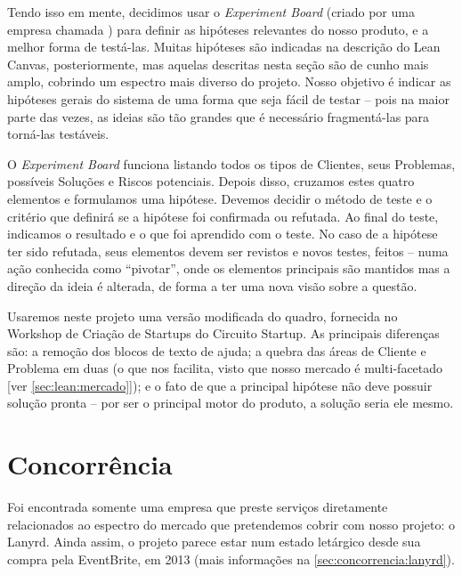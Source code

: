 \documentclass[12pt,a4paper,twoside,hyphens,english,brazil]{abntex2}
\begin{document}
Tendo isso em mente, decidimos usar o \emph{Experiment Board} (criado por uma empresa chamada ) para definir as hipóteses relevantes do nosso produto, e a melhor forma de testá-las. Muitas hipóteses são indicadas na descrição do Lean Canvas, posteriormente, mas aquelas descritas nesta seção são de cunho mais amplo, cobrindo um espectro mais diverso do projeto. Nosso objetivo é indicar as hipóteses gerais do sistema de uma forma que seja fácil de testar -- pois na maior parte das vezes, as ideias são tão grandes que é necessário fragmentá-las para torná-las testáveis\cite{experiment-board-post}.

O \emph{Experiment Board} funciona listando todos os tipos de Clientes, seus Problemas, possíveis Soluções e Riscos potenciais. Depois disso, cruzamos estes quatro elementos e formulamos uma hipótese. Devemos decidir o método de teste e o critério que definirá se a hipótese foi confirmada ou refutada. Ao final do teste, indicamos o resultado e o que foi aprendido com o teste. No caso de a hipótese ter sido refutada, seus elementos devem ser revistos e novos testes, feitos -- numa ação conhecida como ``pivotar'', onde os elementos principais são mantidos mas a direção da ideia é alterada, de forma a ter uma nova visão sobre a questão.

Usaremos neste projeto uma versão modificada do quadro, fornecida no Workshop de Criação de Startups do Circuito Startup\cite{workshop-startup}. As principais diferenças são: a remoção dos blocos de texto de ajuda; a quebra das áreas de Cliente e Problema em duas (o que nos facilita, visto que nosso mercado é multi-facetado [ver \autoref{sec:lean:mercado}]); e o fato de que a principal hipótese não deve possuir solução pronta -- por ser o principal motor do produto, a solução seria ele mesmo.



\fi


\section{Concorrência} \label{sec:empresa:concorrencia}
Foi encontrada somente uma empresa que preste serviços diretamente relacionados ao espectro do mercado que pretendemos cobrir com nosso projeto: o Lanyrd. Ainda assim, o projeto parece estar num estado letárgico desde sua compra pela EventBrite, em 2013 (mais informações na \autoref{sec:concorrencia:lanyrd}).
\end{document}
